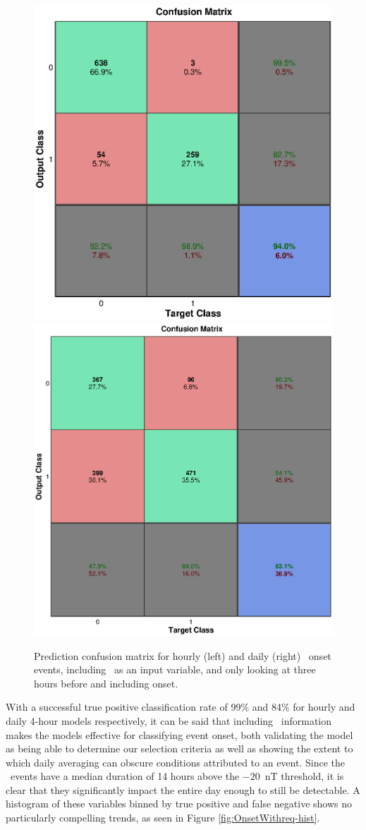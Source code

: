 \begin{figure}[htp!]
	\centering
	\includegraphics[width=0.45\linewidth]{Figures/CH5/NNBinaryOnset-hourly-withreq.eps}
	\includegraphics[width=0.45\linewidth]{Figures/CH5/NNBinaryOnset-daily-withreq.eps}
	\caption{Prediction confusion matrix for hourly (left) and daily (right) \req\ onset events, including \req\ as an input variable, and only looking at three hours before and including onset.}
	\label{fig:OnsetWithreq}
\end{figure}

With a successful true positive classification rate of 99\% and 84\% for hourly and daily 4-hour models respectively, it can be said that including \req\ information makes the models effective for classifying event onset, both validating the model as being able to determine our selection criteria as well as showing the extent to which daily averaging can obscure conditions attributed to an event. Since the \req\ events have a median duration of 14 hours above the $-20$~nT threshold, it is clear that they significantly impact the entire day enough to still be detectable. A histogram of these variables binned by true positive and false negative shows no particularly compelling trends, as seen in Figure \ref{fig:OnsetWithreq-hist}.


